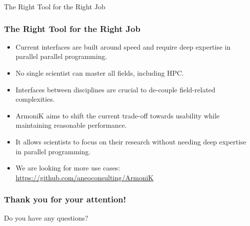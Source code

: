 \documentclass[10pt,aspectratio=1609]{beamer}
\begin{document}
\begin{section}{The Right Tool for the Right Job}
 \begin{frame}
   \frametitle{The Right Tool for the Right Job}
   \begin{itemize}
     \item Current interfaces are built around speed and require deep expertise in parallel parallel programming.
     \item No single scientist can master all fields, including HPC.
     \item Interfaces between disciplines are crucial to de-couple field-related complexities.
     \item ArmoniK aims to shift the current trade-off towards usability while maintaining reasonable performance.
     \item It allows scientists to focus on their research without needing deep expertise in parallel programming.
     \item We are looking for more use cases: \url{https://github.com/aneoconsulting/ArmoniK}
   \end{itemize}
 \end{frame}


 \begin{frame}
   \frametitle{Thank you for your attention!}
   Do you have any questions?
 \end{frame}
\end{section}
\end{document}
